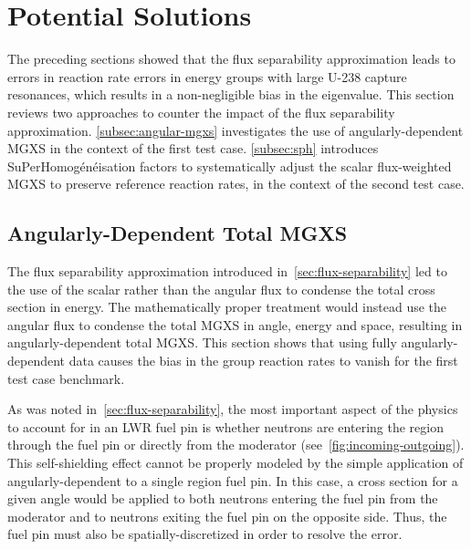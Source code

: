 \section{Potential Solutions}
\label{sec:solutions}

The preceding sections showed that the flux separability approximation leads to errors in reaction rate errors in energy groups with large U-238 capture resonances, which results in a non-negligible bias in the eigenvalue. This section reviews two approaches to counter the impact of the flux separability approximation. \autoref{subsec:angular-mgxs} investigates the use of angularly-dependent MGXS in the context of the first test case. \autoref{subsec:sph} introduces SuPerHomog\'{e}n\'{e}isation factors to systematically adjust the scalar flux-weighted MGXS to preserve reference reaction rates, in the context of the second test case.



\subsection{Angularly-Dependent Total MGXS}
\label{subsec:angular-mgxs}

The flux separability approximation introduced in~\autoref{sec:flux-separability} led to the use of the scalar rather than the angular flux to condense the total cross section in energy. The mathematically proper treatment would instead use the angular flux to condense the total MGXS in angle, energy and space, resulting in angularly-dependent total MGXS. This section shows that using fully angularly-dependent data causes the bias in the group reaction rates to vanish for the first test case benchmark.

As was noted in~\autoref{sec:flux-separability}, the most important aspect of the physics to account for in an LWR fuel pin is whether neutrons are entering the region through the fuel pin or directly from the moderator (see~\autoref{fig:incoming-outgoing}). This self-shielding effect cannot be properly modeled by the simple application of angularly-dependent to a single region fuel pin. In this case, a cross section for a given angle would be applied to both neutrons entering the fuel pin from the moderator and to neutrons exiting the fuel pin on the opposite side. Thus, the fuel pin must also be spatially-discretized in order to resolve the error.

